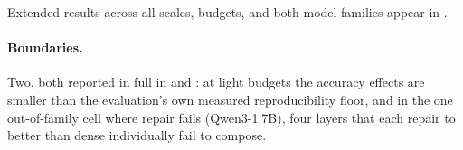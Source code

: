 Extended results across all scales, budgets, and both model families appear in
.

\paragraph{Boundaries.} Two, both reported in full in  and
: at light budgets the accuracy effects are smaller than the evaluation's own
measured reproducibility floor, and in the one out-of-family cell where repair fails
(Qwen3-1.7B), four layers that each repair to better than dense individually fail to compose.


